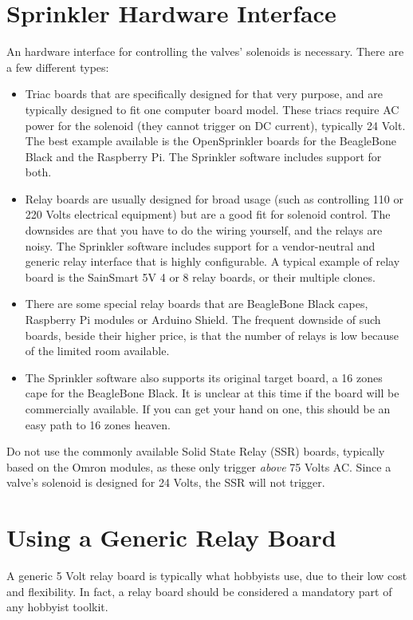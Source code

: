 \documentclass[11pt]{book}
\begin{document}
\section{Sprinkler Hardware Interface}
An hardware interface for controlling the valves' solenoids is necessary. There are a few different types:
\begin{itemize}
\item Triac boards that are specifically designed for that very purpose, and are typically designed to fit one computer board model. These triacs require AC power for the solenoid (they cannot trigger on DC current), typically 24 Volt. The best example available is the OpenSprinkler boards for the BeagleBone Black and the Raspberry Pi. The Sprinkler software includes support for both.
\item Relay boards are usually designed for broad usage (such as controlling 110 or 220 Volts electrical equipment) but are a good fit for solenoid control. The downsides are that you have to do the wiring yourself, and the relays are noisy. The Sprinkler software includes support for a vendor-neutral and generic relay interface that is highly configurable. A typical example of relay board is the SainSmart 5V 4 or 8 relay boards, or their multiple clones.
\item There are some special relay boards that are BeagleBone Black capes, Raspberry Pi modules or Arduino Shield. The frequent downside of such boards, beside their higher price, is that the number of relays is low because of the limited room available.
\item The Sprinkler software also supports its original target board, a 16 zones cape for the BeagleBone Black. It is unclear at this time if the board will be commercially available. If you can get your hand on one, this should be an easy path to 16 zones heaven.
\end{itemize}
Do not use the commonly available Solid State Relay (SSR) boards, typically based on the Omron modules, as these only trigger \emph{above} 75 Volts AC. Since a valve's solenoid is designed for 24 Volts, the SSR will not trigger.
\section{Using a Generic Relay Board}
A generic 5 Volt relay board is typically what hobbyists use, due to their low cost and flexibility. In fact, a relay board should be considered a mandatory part of any hobbyist toolkit.
\end{document}
